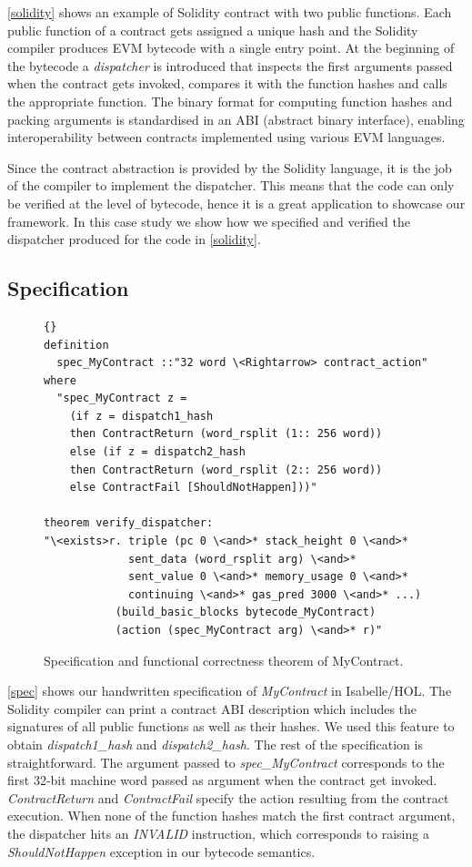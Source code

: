 \documentclass[sigplan,10pt,review]{acmart}\settopmatter{printfolios=true,printccs=false,printacmref=false}
\begin{document}
\autoref{solidity} shows an example of Solidity contract with two public functions.
Each public function of a contract gets assigned a unique hash and
the Solidity compiler produces EVM bytecode with a single entry point.
At the beginning of the bytecode a \textit{dispatcher} is introduced that inspects the first arguments
passed when the contract gets invoked, compares it with the function hashes and
calls the appropriate function.
The binary format for computing function hashes and packing arguments is standardised
in an ABI (abstract binary interface), enabling interoperability between
contracts implemented using various EVM languages.

Since the contract abstraction is provided by the Solidity language,
it is the job of the compiler to implement the dispatcher.
This means that the code can only be verified at the level of bytecode,
hence it is a great application to showcase our framework.
In this case study we show how we specified and verified the
dispatcher produced for the code in \autoref{solidity}.
%

\subsection{Specification}

\begin{figure}[h]
\begin{lstlisting}[language=Isar]{}
definition 
  spec_MyContract ::"32 word \<Rightarrow> contract_action"
where
  "spec_MyContract z = 
	(if z = dispatch1_hash 
	then ContractReturn (word_rsplit (1:: 256 word))
	else (if z = dispatch2_hash 
	then ContractReturn (word_rsplit (2:: 256 word))
	else ContractFail [ShouldNotHappen]))"

theorem verify_dispatcher:
"\<exists>r. triple (pc 0 \<and>* stack_height 0 \<and>*
             sent_data (word_rsplit arg) \<and>*
             sent_value 0 \<and>* memory_usage 0 \<and>*
             continuing \<and>* gas_pred 3000 \<and>* ...)
	       (build_basic_blocks bytecode_MyContract)
	       (action (spec_MyContract arg) \<and>* r)"
\end{lstlisting}
\caption{Specification and functional correctness theorem of MyContract.}
\label{spec}
\end{figure}

\autoref{spec} shows our handwritten specification of \textit{MyContract} in Isabelle/HOL.
The Solidity compiler can print a contract ABI description which includes the
signatures of all public functions as well as their hashes.
We used this feature to obtain \textit{dispatch1\_hash} and \textit{dispatch2\_hash}.
The rest of the specification is straightforward.
The argument passed to \textit{spec\_MyContract} corresponds to the first 32-bit
machine word passed as argument when the contract get invoked.
\textit{ContractReturn} and \textit{ContractFail} specify the action
resulting from the contract execution.
When none of the function hashes match the first contract argument,
the dispatcher hits an \textit{INVALID} instruction,
which corresponds to raising a \textit{ShouldNotHappen} exception
in our bytecode semantics.
\end{document}
